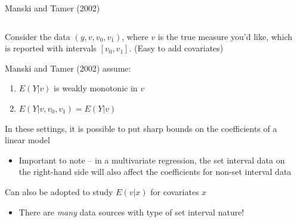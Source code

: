 \documentclass[notes,11pt, aspectratio=169]{beamer}
\newenvironment{wideitemize}{\itemize\addtolength{\itemsep}{10pt}}{\enditemize}
\begin{document}
\begin{frame}{Manski and Tamer (2002)}
      \begin{columns}[onlytextwidth, T] %
        \begin{column}{.9\textwidth}
          \begin{wideitemize}
          \item Consider the data $(y, v, v_{0}, v_{1})$, where $v$ is
            the true measure you'd like, which is reported with
            intervals $[v_{0},v_{1}]$. (Easy to add covariates)
          \item Manski and Tamer (2002) assume:
            \begin{enumerate}
            \item $E(Y|v) $ is weakly monotonic in $v$
            \item $E(Y|v, v_{0},v_{1})= E(Y|v)$
            \end{enumerate}
          \item In these settings, it is possible to put sharp bounds
            on the coefficients of a linear model
            \begin{itemize}
            \item Important to note -- in a multivariate regression,
              the set interval data on the right-hand side will also
              affect the coefficients for non-set interval data
            \end{itemize}
          \item Can also be adopted to study $E(v | x)$ for covariates $x$
            \begin{itemize}
            \item There are \emph{many} data sources with type of set interval nature!
            \end{itemize}
          \end{wideitemize}
      \end{column}%
      \hfill%
      \begin{column}{.5\textwidth}
      \end{column}%
    \end{columns}
\end{frame}
\end{document}
